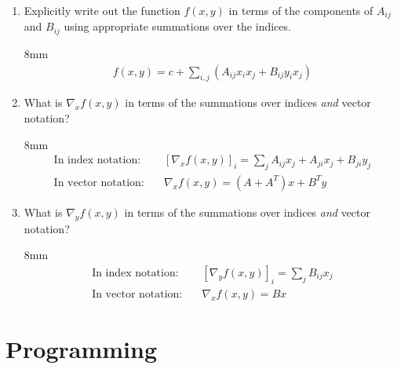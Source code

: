 \documentclass{article}
\newenvironment{solution}{\begin{adjustwidth}{8mm}{}}{\end{adjustwidth}}
\begin{document}
\begin{enumerate}
        \item Explicitly write out the function $f(x,y)$ in terms of the components of $A_{ij}$ and $B_{ij}$ using appropriate summations over the indices.
        \begin{solution}
                \vspace{-5mm}
                \begin{align*}
                        f(x,y) = c + \sum_{i,j} (A_{ij} x_i x_j + B_{ij} y_i x_j)
                \end{align*}
        \end{solution}
        \item What is $\nabla_x f(x,y)$ in terms of the summations over indices \textit{and} vector notation?
        \begin{solution}
                \vspace{-5mm}
                \begin{align*}
                        \text{In index notation:}& \quad 
                        [\nabla_x f(x,y)]_i = \sum_j A_{ij} x_j + A_{ji} x_j + B_{ji} y_j \\
                        \text{In vector notation:}& \quad
                        \nabla_x f(x,y) = (A + A^T) x + B^T y
                \end{align*}
        \end{solution}
        \item What is $\nabla_y f(x,y)$ in terms of the summations over indices \textit{and} vector notation?
        \begin{solution}
                \vspace{-5mm}
                \begin{align*}
                        \text{In index notation:}& \quad 
                        [\nabla_y f(x,y)]_i = \sum_j B_{ij} x_j \\
                        \text{In vector notation:}& \quad
                        \nabla_x f(x,y) = Bx
                \end{align*}
        \end{solution}
\end{enumerate}


\section*{Programming}
\end{document}
